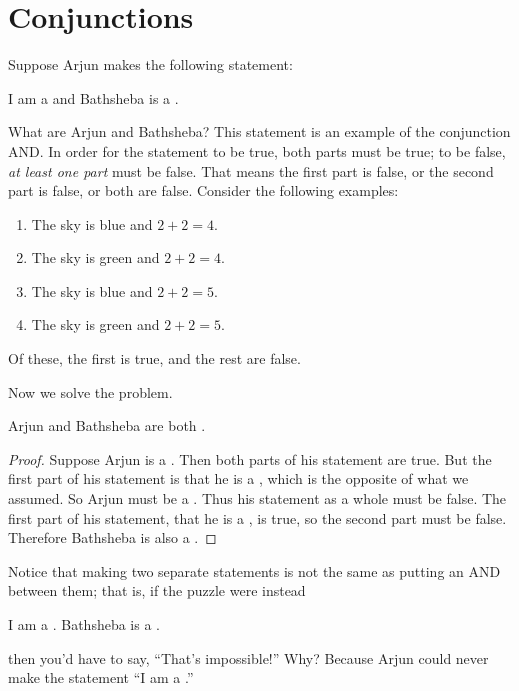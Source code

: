 \documentclass{tufte-book}
\begin{document}


\section{Conjunctions}
\label{sec:conjunctions}

Suppose Arjun makes the following statement:
\begin{example}
  \begin{dialogue}
     I am a \knave and Bathsheba is a \knight.
  \end{dialogue}
\end{example}

What are Arjun and Bathsheba? This statement is an example of the conjunction AND. In order for the statement to be true, both parts must be true; to be false, \emph{at least one part} must be false. That means the first part is false, or the second part is false, or both are false. Consider the following examples:
\begin{enumerate}
    \item The sky is blue and $2 + 2 = 4$.
    \item The sky is green and $2 + 2 = 4$.
    \item The sky is blue and $2 + 2 = 5$.
    \item The sky is green and $2 + 2 = 5$.
\end{enumerate}
Of these, the first is true, and the rest are false.

Now we solve the problem.
\begin{claim}
  Arjun and Bathsheba are both \knaves.
\end{claim}

\begin{proof}
  Suppose Arjun is a \knight. Then both parts of his statement are true. But the first part of his statement is that he is a \knave, which is the opposite of what we assumed. So Arjun must be a \knave. Thus his statement as a whole must be false. The first part of his statement, that he is a \knave, is true, so the second part must be false. Therefore Bathsheba is also a \knave.
\end{proof}

Notice that making two separate statements is not the same as putting an AND between them; that is, if the puzzle were instead
\begin{example}
  \begin{dialogue}
     I am a \knave. Bathsheba is a \knight.
  \end{dialogue}
\end{example}
then you'd have to say, ``That's impossible!'' Why? Because Arjun could never make the statement ``I am a \knave.''
\end{document}
